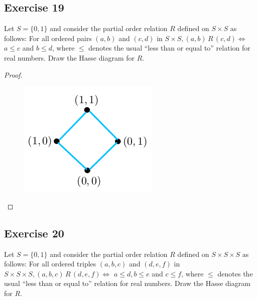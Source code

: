 \documentclass[14pt]{extarticle}
\begin{document}
\subsection{Exercise 19}
Let \(S = \{0, 1\}\) and consider the partial order relation $R$ defined on \(S \times S\) as follows: For all 
ordered pairs \((a, b)\) and \((c, d)\) in \(S \times S, (a, b) \,R\, (c, d) \iff\) \(a \leq c\) and \(b \leq d\), 
where \(\leq\) denotes the usual “less than or equal to” relation for real numbers. Draw the Hasse diagram for $R$.

\begin{proof}
\begin{figure}[ht!]
\centering
\includegraphics[scale=0.4]{../images/8.5.19.png}
\end{figure}
\end{proof}

\subsection{Exercise 20}
Let \(S = \{0, 1\}\) and consider the partial order relation $R$ defined on \(S \times S \times S\) as follows: 
For all ordered triples \((a, b, c)\) and \((d, e, f)\) in \(S \times S \times S, (a, b, c) \,R\, (d, e, f) \iff\) 
\(a \leq d, b \leq e\) and \(c \leq f\), where \(\leq\) denotes the usual “less than or equal to” relation for real 
numbers. Draw the Hasse diagram for $R$.
\end{document}
